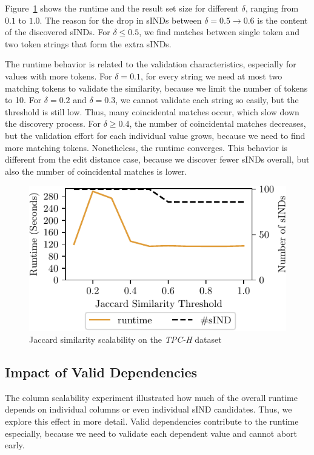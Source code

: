 Figure~\ref{fig:eval:jac_sim_scalability} shows the runtime and the result set size for different $\delta$, ranging from $0.1$ to $1.0$.
The reason for the drop in sINDs between $\delta = 0.5 \to 0.6$ is the content of the discovered sINDs.
For $\delta \leq 0.5$, we find matches between single token and two token strings that form the extra sINDs.

The runtime behavior is related to the validation characteristics, especially for values with more tokens.
For $\delta = 0.1$, for every string we need at most two matching tokens to validate the similarity, because we limit the number of tokens to 10.
For $\delta = 0.2$ and $\delta = 0.3$, we cannot validate each string so easily, but the threshold is still low.
Thus, many coincidental matches occur, which slow down the discovery process.
For $\delta \geq 0.4$, the number of coincidental matches decreases, but the validation effort for each individual value grows, because we need to find more matching tokens.
Nonetheless, the runtime converges.
This behavior is different from the edit distance case, because we discover fewer sINDs overall, but also the number of coincidental matches is lower.
\begin{figure}[ht]
    \centering
    \includegraphics[width=.55\textwidth]{figures/jac_scaling.pdf}
    \caption{Jaccard similarity scalability on the \emph{TPC-H} dataset}
    \label{fig:eval:jac_sim_scalability}
\end{figure}

\subsection{Impact of Valid Dependencies}
\label{subsection:evaluation:valid_impact}
The column scalability experiment illustrated how much of the overall runtime depends on individual columns or even individual sIND candidates.
Thus, we explore this effect in more detail.
Valid dependencies contribute to the runtime especially, because we need to validate each dependent value and cannot abort early.

